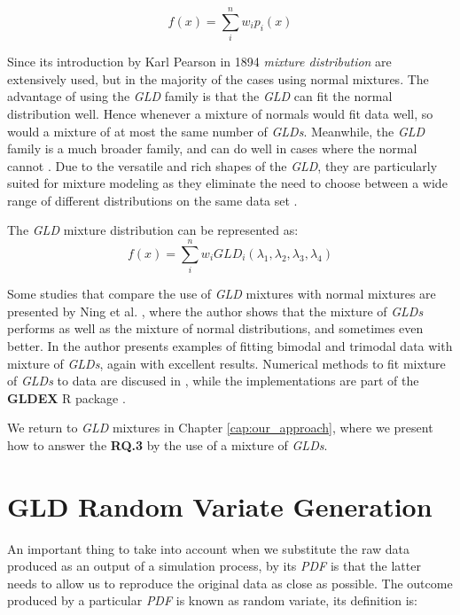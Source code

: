 \begin{equation}
f(x)=\sum_{i}^n w_{i}p_{i}(x)
\end{equation}

Since its introduction by Karl Pearson in 1894 \textit{mixture distribution} are extensively used, but in the majority of the cases using normal mixtures. The advantage of using the \textit{GLD} family is that the \textit{GLD} can fit the normal distribution well. Hence whenever a mixture of normals would fit data well, so would a mixture of at most the same number of \textit{GLDs}. Meanwhile, the \textit{GLD} family is a much broader family, and can do well in cases where the normal cannot \cite{Ning2008}. Due to the versatile and rich shapes of the \textit{GLD}, they are particularly suited for mixture modeling as they eliminate the need to choose between a wide range of different distributions on the same data set \cite{Su2007}.

The \textit{GLD} mixture distribution can be represented as:
\begin{equation}
f(x)=\sum_{i}^n w_{i}GLD_{i}(\lambda_{1},\lambda_{2},\lambda_{3},\lambda_{4})
\end{equation}

Some studies that compare the use of \textit{GLD} mixtures with normal mixtures are presented by Ning et al. \cite{Ning2008}, where the author shows that the mixture of \textit{GLDs} performs as well as the mixture of normal distributions, and sometimes even better. In \cite{Su2011} the author presents examples of fitting bimodal and trimodal data with mixture of \textit{GLDs}, again with excellent results. Numerical methods to fit mixture of \textit{GLDs} to data are discused in \cite{Su2007, Su2011}, while the implementations are part of the \textbf{GLDEX} R package \cite{Su2007}.

We return to \textit{GLD} mixtures in Chapter \ref{cap:our_approach}, where we present how to answer the \textbf{RQ.3} by the use of a mixture of \textit{GLDs}.

\section{GLD Random Variate Generation}\label{sec:gld_random_variate}
An important thing to take into account when we substitute the raw data produced as an output of a simulation process, by its \textit{PDF} is that the latter needs to allow us to reproduce the original data as close as possible. The outcome produced by a particular \textit{PDF} is known as random variate, its definition is:

